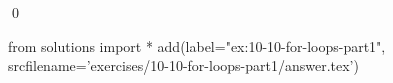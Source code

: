 
\begin{ex}
  \label{ex:10-10-for-loops-part1}
  
  \qed
\end{ex}
\begin{python0}
from solutions import *
add(label="ex:10-10-for-loops-part1",
    srcfilename='exercises/10-10-for-loops-part1/answer.tex')
\end{python0}
